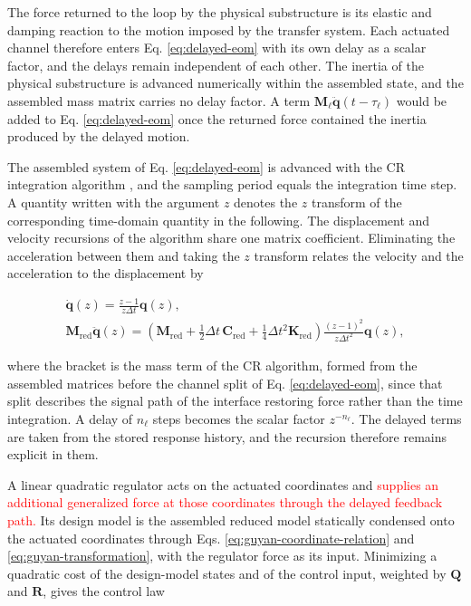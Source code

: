 \documentclass[a4paper,fleqn,review,12pt]{cas-sc}
\numberwithin{equation}{section}
\newcommand{\rev}[1]{\textcolor{red}{#1}}
\begin{document}
The force returned to the loop by the physical substructure is its elastic and damping reaction to the motion imposed by the transfer system. Each actuated channel therefore enters Eq. \eqref{eq:delayed-eom} with its own delay as a scalar factor, and the delays remain independent of each other. The inertia of the physical substructure is advanced numerically within the assembled state, and the assembled mass matrix carries no delay factor. A term \(\mathbf{M}_{\ell}\ddot{\bm{q}}(t-\tau_{\ell})\) would be added to Eq. \eqref{eq:delayed-eom} once the returned force contained the inertia produced by the delayed motion.

The assembled system of Eq. \eqref{eq:delayed-eom} is advanced with the CR integration algorithm \rev{\cite{ChenCR2008}}, and the sampling period equals the integration time step. A quantity written with the argument \(z\) denotes the \(z\) transform of the corresponding time-domain quantity in the following. The displacement and velocity recursions of the algorithm share one matrix coefficient. Eliminating the acceleration between them and taking the \(z\) transform relates the velocity and the acceleration to the displacement by

\vspace{-3.5em}
\begin{equation}
	\begin{gathered}
		\dot{\bm{q}}(z)=\frac{z-1}{z\Delta t}\bm{q}(z),\\
		\mathbf{M}_{\mathrm{red}}\ddot{\bm{q}}(z)=
		\left(\mathbf{M}_{\mathrm{red}}
		+\tfrac{1}{2}\Delta t\,\mathbf{C}_{\mathrm{red}}
		+\tfrac{1}{4}\Delta t^{2}\mathbf{K}_{\mathrm{red}}\right)
		\frac{(z-1)^{2}}{z\Delta t^{2}}\bm{q}(z),
	\end{gathered}
	\label{eq:z-derivatives}
\end{equation}
\vspace{-3.5em}

\noindent where the bracket is the mass term of the CR algorithm, formed from the assembled matrices before the channel split of Eq. \eqref{eq:delayed-eom}, since that split describes the signal path of the interface restoring force rather than the time integration. A delay of \(n_{\ell}\) steps becomes the scalar factor \(z^{-n_{\ell}}\). The delayed terms are taken from the stored response history, and the recursion therefore remains explicit in them.

A linear quadratic regulator acts on the actuated coordinates and \rev{supplies an additional generalized force at those coordinates through the delayed feedback path.} Its design model is the assembled reduced model statically condensed onto the actuated coordinates through Eqs. \eqref{eq:guyan-coordinate-relation} and \eqref{eq:guyan-transformation}, with the regulator force as its input. Minimizing a quadratic cost of the design-model states and of the control input, weighted by \(\mathbf{Q}\) and \(\mathbf{R}\), gives the control law
\end{document}
